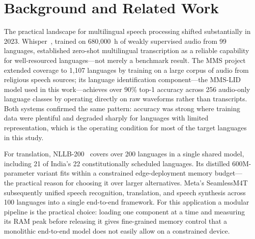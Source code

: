 \documentclass[12pt, onecolumn]{IEEEtran}
\begin{document}
\section{Background and Related Work}

The practical landscape for multilingual speech processing shifted substantially in 2023. Whisper~\cite{radford2022whisper}, trained on 680,000~h of weakly supervised audio from 99 languages, established zero-shot multilingual transcription as a reliable capability for well-resourced languages---not merely a benchmark result. The MMS project~\cite{pratap2023scaling} extended coverage to 1,107 languages by training on a large corpus of audio from religious speech sources; its language identification component---the MMS-LID model used in this work---achieves over 90\% top-1 accuracy across 256 audio-only language classes by operating directly on raw waveforms rather than transcripts. Both systems confirmed the same pattern: accuracy was strong where training data were plentiful and degraded sharply for languages with limited representation, which is the operating condition for most of the target languages in this study.

For translation, NLLB-200~\cite{costajussa2024nllb} covers over 200 languages in a single shared model, including 21 of India's 22 constitutionally scheduled languages. Its distilled 600M-parameter variant fits within a constrained edge-deployment memory budget---the practical reason for choosing it over larger alternatives. Meta's SeamlessM4T~\cite{barrault2023seamless} subsequently unified speech recognition, translation, and speech synthesis across 100 languages into a single end-to-end framework. For this application a modular pipeline is the practical choice: loading one component at a time and measuring its RAM peak before releasing it gives fine-grained memory control that a monolithic end-to-end model does not easily allow on a constrained device.
\end{document}
